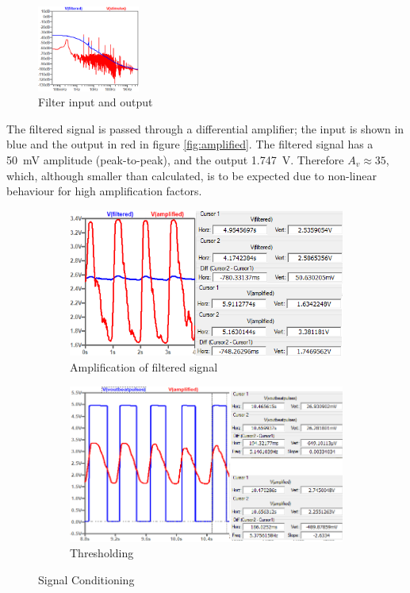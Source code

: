 \begin{figure}
\centering
\includegraphics[width=0.3\textwidth]{./Figures/filtout}
\caption{Filter input and output}
\label{fig:filtout}
\end{figure}

The filtered signal is passed through a differential amplifier; the input is shown in blue and the output in red in figure \ref{fig:amplified}. The filtered signal has a \SI{50}{mV} amplitude (peak-to-peak), and the output \SI{1.747}{V}. Therefore $A_v \approx 35$, which, although smaller than calculated, is to be expected due to non-linear behaviour for high amplification factors. 

\begin{figure}[h]
 \footnotesize
   \centering
   \begin{subfigure}[]{0.49\textwidth}
        \includegraphics[width=\linewidth]{./Figures/amplified}
	  \caption{Amplification of filtered signal} \label{subfig:amplified}	
   \end{subfigure}
   \begin{subfigure}[]{0.49\textwidth}
  	 \includegraphics[width=\linewidth]{./Figures/pulses}
	  \caption{Thresholding} \label{subfig:pulses}	
   \end{subfigure}
   \caption{Signal Conditioning}
 \end{figure}

